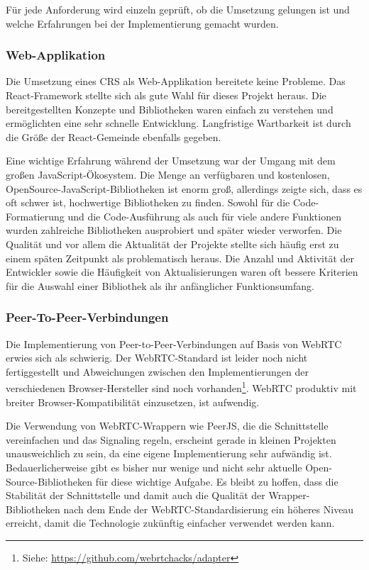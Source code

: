 Für jede Anforderung wird einzeln geprüft, ob die Umsetzung gelungen ist und welche Erfahrungen bei der Implementierung gemacht wurden.

\subsubsection*{Web-Applikation}

Die Umsetzung eines CRS als Web-Applikation bereitete keine Probleme. Das React-Framework stellte sich als gute Wahl für dieses Projekt heraus. Die bereitgestellten Konzepte und Bibliotheken waren einfach zu verstehen und ermöglichten eine sehr schnelle Entwicklung. Langfristige Wartbarkeit ist durch die Größe der React-Gemeinde ebenfalls gegeben.

Eine wichtige Erfahrung während der Umsetzung war der Umgang mit dem großen JavaScript-Ökosystem. Die Menge an verfügbaren und kostenlosen, OpenSource-JavaScript-Bibliotheken ist enorm groß, allerdings zeigte sich, dass es oft schwer ist, hochwertige Bibliotheken zu finden. Sowohl für die Code-Formatierung und die Code-Ausführung als auch für viele andere Funktionen wurden zahlreiche Bibliotheken ausprobiert und später wieder verworfen. Die Qualität und vor allem die Aktualität der Projekte stellte sich häufig erst zu einem späten Zeitpunkt als problematisch heraus. Die Anzahl und Aktivität der Entwickler sowie die Häufigkeit von Aktualisierungen waren oft bessere Kriterien für die Auswahl einer Bibliothek als ihr anfänglicher Funktionsumfang.

\subsubsection*{Peer-To-Peer-Verbindungen}
Die Implementierung von Peer-to-Peer-Verbindungen auf Basis von WebRTC erwies sich als schwierig. Der WebRTC-Standard ist leider noch nicht fertiggestellt und  Abweichungen zwischen den Implementierungen der verschiedenen Browser-Hersteller sind noch vorhanden\footnote{Siehe: \url{https://github.com/webrtchacks/adapter}}. WebRTC produktiv mit breiter Browser-Kompatibilität einzusetzen, ist aufwendig.

Die Verwendung von WebRTC-Wrappern wie PeerJS, die die Schnittstelle vereinfachen und das Signaling regeln, erscheint gerade in kleinen Projekten unausweichlich zu sein, da eine eigene Implementierung sehr aufwändig ist. Bedauerlicherweise gibt es bisher nur wenige und nicht sehr aktuelle Open-Source-Bibliotheken für diese wichtige Aufgabe. Es bleibt zu hoffen, dass die Stabilität der Schnittstelle und damit auch die Qualität der Wrapper-Bibliotheken nach dem Ende der WebRTC-Standardisierung ein höheres Niveau erreicht, damit die Technologie zukünftig einfacher verwendet werden kann.

